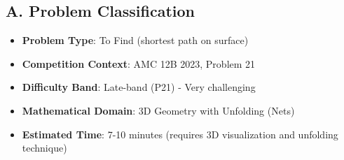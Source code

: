 \documentclass[12pt]{article}
\begin{document}
\begin{problemconfigbox}
\subsection*{A. Problem Classification}
\begin{itemize}[leftmargin=*]
    \item \textbf{Problem Type}: To Find (shortest path on surface)
    \item \textbf{Competition Context}: AMC 12B 2023, Problem 21
    \item \textbf{Difficulty Band}: Late-band (P21) - Very challenging
    \item \textbf{Mathematical Domain}: 3D Geometry with Unfolding (Nets)
    \item \textbf{Estimated Time}: 7-10 minutes (requires 3D visualization and unfolding technique)
\end{itemize}


\end{problemconfigbox}
\end{document}
